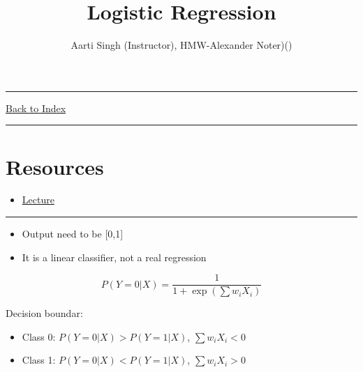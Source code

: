 \documentclass[letterpaper,10pt]{article}
\title{\textbf{Logistic Regression}}
\author{Aarti Singh (Instructor), HMW-Alexander Noter)()}
\newcommand{\panhline}{\begin{center}\rule{\textwidth}{1pt}\end{center}}
\begin{document}
\maketitle

\panhline
\href{../index.html}{Back to Index}

\panhline
\tableofcontents

\section*{Resources}

\begin{itemize}
	\item \href{../../Lectures/LectureFile.pdf}{Lecture}
\end{itemize}

\panhline

\begin{itemize}
	\item Output need to be [0,1]
	\item It is a linear classifier, not a real regression
\end{itemize}
	
$$P(Y=0|X)=\frac{1}{1+\exp(\sum{w_iX_i})}$$

Decision boundar:
\begin{itemize}
	\item Class 0: $P(Y=0|X)>P(Y=1|X)$, $\sum{w_iX_i}<0$
	\item Class 1: $P(Y=0|X)<P(Y=1|X)$, $\sum{w_iX_i}>0$
\end{itemize}
\end{document}
